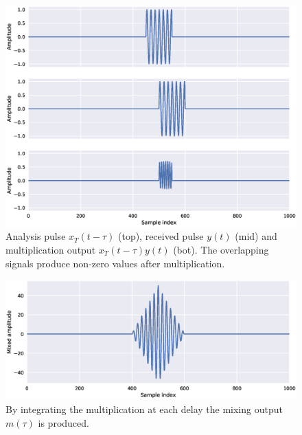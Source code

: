 \begin{figure}[h]
	\centering
	\includegraphics[scale=0.5]{figs_temp/mixing1}
	\caption{Analysis pulse $x_T(t-\tau)$ (top), received pulse $y(t)$ (mid) and multiplication output $x_T(t-\tau)y(t)$ (bot). The overlapping signals produce non-zero values after multiplication.}
	\label{fig:mix1}
\end{figure}

\begin{figure}[h]
	\centering
	\includegraphics[scale=0.5]{figs_temp/mixing2}
	\caption{By integrating the multiplication at each delay the mixing output $m(\tau)$ is produced.}
	\label{fig:mix2}
\end{figure}

